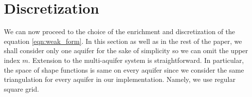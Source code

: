 \documentclass{elsarticle}
\def\vc#1{\mathbf{\boldsymbol{#1}}}     %
\newcommand{\dd}{\; \mathrm{d}}
\newcommand{\bx}{\vc{x}}
\begin{document}

\section{Discretization}
\label{sec:discretization}
We can now proceed to the choice of the enrichment and discretization of the equation \eqref{eqn:weak_form}.
In this section as well as in the rest of the paper, we shall consider only one aquifer for the sake of simplicity
so we can omit the upper index $m$. Extension to the multi-aquifer system is straightforward. 
In particular, the space of shape functions is same on every aquifer since we consider 
the same triangulation for every aquifer in our implementation. 
Namely, we use regular square grid.
\end{document}
